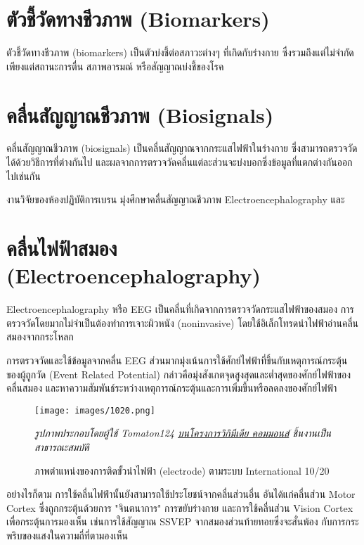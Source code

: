 \section{ตัวชี้วัดทางชีวภาพ (Biomarkers)}
ตัวชี้วัดทางชีวภาพ (biomarkers) เป็นตัวบ่งชี้ต่อสภาวะต่างๆ ที่เกิดกับร่างกาย ซึ่งรวมถึงแต่ไม่จำกัดเพียงแต่สถานะการตื่น สภาพอารมณ์
หรือสัญญาณบ่งชี้ของโรค

\section{คลื่นสัญญาณชีวภาพ (Biosignals)}
คลื่นสัญญาณชีวภาพ (biosignals) เป็นคลื่นสัญญาณจากกระแสไฟฟ้าในร่างกาย ซึ่งสามารถตรวจวัดได้ด้วยวิธีการที่ต่างกันไป
และผลจากการตรวจวัดคลื่นแต่ละส่วนจะบ่งบอกซึ่งข้อมูลที่แตกต่างกันออกไปเช่นกัน

งานวิจัยของห้องปฏิบัติการเบรน มุ่งศึกษาคลื่นสัญญาณชีวภาพ Electroencephalography และ

\section{คลื่นไฟฟ้าสมอง (Electroencephalography)}
Electroencephalography หรือ EEG เป็นคลื่นที่เกิดจากการตรวจวัดกระแสไฟฟ้าของสมอง การตรวจวัดโดยมากไม่จำเป็นต้องทำการเจาะผิวหนัง
(noninvasive) โดยใช้อิเล็กโทรดนำไฟฟ้าอ่านคลื่นสมองจากกระโหลก

การตรวจวัดและใช้ข้อมูลจากคลื่น EEG ส่วนมากมุ่งเน้นการใช้ศักย์ไฟฟ้าที่ขึ้นกับเหตุการณ์กระตุ้นของผู้ถูกวัด
(Event Related Potential) กล่าวคือมุ่งสังเกตจุดสูงสุดและต่ำสุดของศักย์ไฟฟ้าของคลื่นสมอง
และหาความสัมพันธ์ระหว่างเหตุการณ์กระตุ้นและการเพิ่มขึ้นหรือลดลงของศักย์ไฟฟ้า

\begin{figure}[h]
	\centering
	\texttt{[image: images/1020.png]}
	\caption{ภาพตำแหน่งของการติดขั้วนำไฟฟ้า (electrode) ตามระบบ International 10/20}
	\hspace{\linewidth}
	\textit{รูปภาพประกอบโดยผู้ใช้ Tomaton124 \href{https://commons.wikimedia.org/wiki/File:21_electrodes_of_International_10-20_system_for_EEG.svg}{บนโครงการวิกิมีเดีย คอมมอนส์}
		ชิ้นงานเป็นสาธารณะสมบัติ}
\end{figure}

อย่างไรก็ตาม การใช้คลื่นไฟฟ้านั้นยังสามารถใช้ประโยชน์จากคลื่นส่วนอื่น อันได้แก่คลื่นส่วน Motor Cortex ซึ่งถูกกระตุ้นด้วยการ "จินตนาการ"
การขยับร่างกาย และการใช้คลื่นส่วน Vision Cortex เพื่อกระตุ้นการมองเห็น เช่นการใช้สัญญาณ SSVEP จากสมองส่วนท้ายทอยซึ่งจะสั่นพ้อง
กับการกระพริบของแสงในความถี่ที่ตามองเห็น

